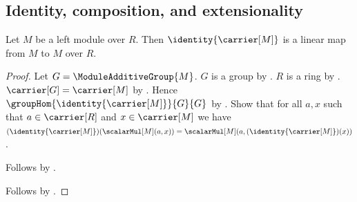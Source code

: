 \subsection{Identity, composition, and extensionality}

\begin{proposition}\label{identity_linear_map}
    Let $M$ be a left module over $R$.
    Then $\identity{\carrier[M]}$ is a linear map from $M$ to $M$ over $R$.
\end{proposition}
\begin{proof}
    Let $G=\ModuleAdditiveGroup{M}$.
    $G$ is a group by .
    $R$ is a ring by .
    $\carrier[G]=\carrier[M]$ by
        .
    Hence $\groupHom{\identity{\carrier[M]}}{G}{G}$ by
        .
    Show that for all $a,x$ such that $a\in\carrier[R]$ and
        $x\in\carrier[M]$ we have
        $(\identity{\carrier[M]})(\scalarMul[M](a,x))
            =\scalarMul[M](a,(\identity{\carrier[M]})(x))$.
    \begin{subproof}
        Follows by .
    \end{subproof}
    Follows by .
\end{proof}

